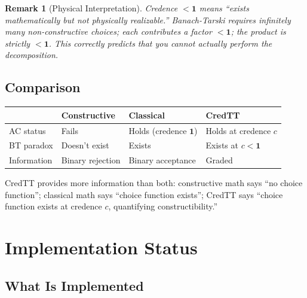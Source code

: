 \documentclass[11pt,a4paper]{article}
\newtheorem{remark}{Remark}[section]
\newcommand{\one}{\mathbf{1}}
\begin{document}
\begin{remark}[Physical Interpretation]
Credence $< \one$ means ``exists mathematically but not physically realizable.'' Banach-Tarski requires infinitely many non-constructive choices; each contributes a factor $< \one$; the product is strictly $< \one$. This correctly predicts that you cannot actually perform the decomposition.
\end{remark}

\subsection{Comparison}

\begin{center}
\begin{tabular}{l|l|l|l}
& \textbf{Constructive} & \textbf{Classical} & \textbf{CredTT} \\
\hline
AC status & Fails & Holds (credence $\one$) & Holds at credence $c$ \\
BT paradox & Doesn't exist & Exists & Exists at $c < \one$ \\
Information & Binary rejection & Binary acceptance & Graded \\
\end{tabular}
\end{center}

CredTT provides more information than both: constructive math says ``no choice function''; classical math says ``choice function exists''; CredTT says ``choice function exists at credence $c$, quantifying constructibility.''

\section{Implementation Status}
\label{sec:status}

\subsection{What Is Implemented}
\end{document}

